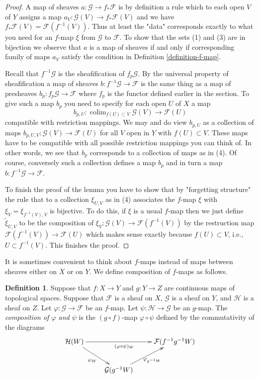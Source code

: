 \documentclass{stacks-project}
\theoremstyle{plain}
\theoremstyle{definition}
\newtheorem{definition}[subsection]{Definition}
\theoremstyle{remark}
\numberwithin{equation}{subsection}
\def\colim{\mathop{\mathrm{colim}}\nolimits}
\begin{document}
\begin{proof}
A map of sheaves $a : \mathcal{G} \to f_*\mathcal{F}$
is by definition a rule which to each open $V$ of $Y$ assigns
a map $a_V : \mathcal{G}(V) \to f_*\mathcal{F}(V)$
and we have $f_*\mathcal{F}(V) = \mathcal{F}(f^{-1}(V))$.
Thus at least the "data" corresponds exactly to what you need
for an $f$-map $\xi$ from $\mathcal{G}$ to $\mathcal{F}$.
To show that the sets (1) and (3) are in bijection we observe that
$a$ is a map of sheaves if and only if corresponding family of maps $a_V$
satisfy the condition in Definition \ref{definition-f-map}.

\medskip\noindent
Recall that $f^{-1}\mathcal{G}$ is the sheafification of $f_p\mathcal{G}$.
By the universal property of sheafification a map of sheaves
$b : f^{-1}\mathcal{G} \to \mathcal{F}$ is the same thing as a map of
presheaves $b_p : f_p\mathcal{G} \to \mathcal{F}$ where $f_p$ is the
functor defined earlier in the section. To give such a map $b_p$
you need to specify for each open $U$ of $X$ a map
$$
b_{p, U} :
\colim_{f(U) \subset V} \mathcal{G}(V)
\longrightarrow
\mathcal{F}(U)
$$
compatible with restriction mappings. We may and do view $b_{p, U}$
as a collection of maps $b_{p, U, V} : \mathcal{G}(V) \to \mathcal{F}(U)$
for all $V$ open in $Y$ with $f(U) \subset V$. These maps have to be
compatible with all possible restriction mappings you can think of.
In other words, we see that $b_p$ corresponds to a collection of maps
as in (4). Of course, conversely such a collection defines a map
$b_p$ and in turn a map $b : f^{-1}\mathcal{G} \to \mathcal{F}$.

\medskip\noindent
To finish the proof of the lemma you have to show that by
"forgetting structure" the rule that to a collection $\xi_{U, V}$
as in (4) associates the $f$-map $\xi$ with $\xi_V = \xi_{f^{-1}(V), V}$
is bijective. To do this, if $\xi$ is a usual $f$-map then we just
define $\tilde \xi_{U, V}$ to be the composition of
$\xi_V : \mathcal{G}(V) \to \mathcal{F}(f^{-1}(V))$
by the restruction map $\mathcal{F}(f^{-1}(V)) \to \mathcal{F}(U)$
which makes sense exactly because $f(U) \subset V$, i.e.,
$U \subset f^{-1}(V)$. This finishes the proof.
\end{proof}

\noindent
It is sometimes convenient to think about $f$-maps
instead of maps between sheaves either on $X$ or on $Y$.
We define composition of $f$-maps as follows.

\begin{definition}
\label{definition-composition-f-maps}
Suppose that $f : X \to Y$ and $g : Y \to Z$ are continuous
maps of topological spaces. Suppose that $\mathcal{F}$ is
a sheaf on $X$, $\mathcal{G}$ is a sheaf on $Y$, and
$\mathcal{H}$ is a sheaf on $Z$.
Let $\varphi : \mathcal{G} \to \mathcal{F}$ be an $f$-map.
Let $\psi : \mathcal{H} \to \mathcal{G}$ be an $g$-map.
The {\it composition of $\varphi$ and $\psi$} is the
$(g \circ f)$-map $\varphi \circ \psi$ defined
by the commutativity of the diagrams
$$
\xymatrix{
\mathcal{H}(W) \ar[rr]_{(\varphi \circ \psi)_W}
\ar[rd]_{\psi_W} & &
\mathcal{F}(f^{-1}g^{-1}W) \\
&
\mathcal{G}(g^{-1}W)
\ar[ru]_{\varphi_{g^{-1}W}}
}
$$
\end{definition}
\end{document}
